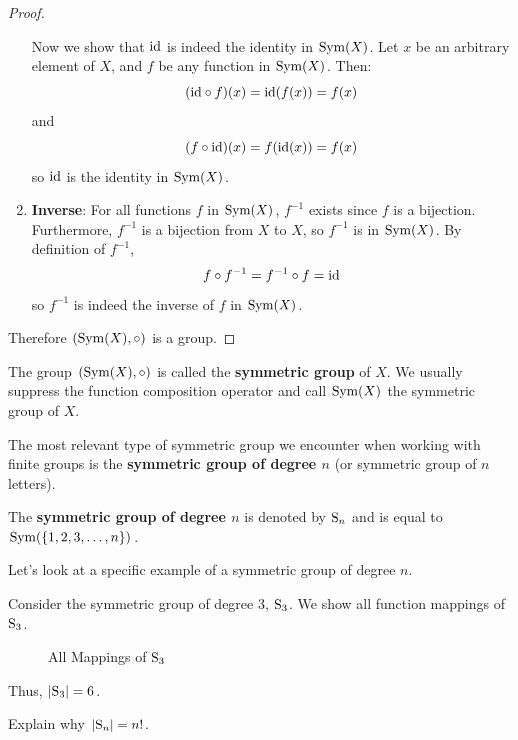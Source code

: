\begin{proof}
\begin{enumerate}
\begin{itemize}
        \end{itemize}
        Now we show that $\mathrm{id}$ is indeed the identity in $\mathrm{Sym}(X)$. Let $x$ be an arbitrary element of $X$, and $f$ be any function in $\mathrm{Sym}(X)$. Then:
        \[
            (\mathrm{id} \circ f)(x) = \mathrm{id}(f(x)) = f(x)
        \]
        and
        \[
            (f \circ \mathrm{id})(x) = f(\mathrm{id}(x)) = f(x)
        \]
        so $\mathrm{id}$ is the identity in $\mathrm{Sym}(X)$.
        \item \textbf{Inverse}: For all functions $f$ in $\mathrm{Sym}(X)$, $f^{-1}$ exists since $f$ is a bijection. Furthermore, $f^{-1}$ is a bijection from $X$ to $X$, so $f^{-1}$ is in $\mathrm{Sym}(X)$. By definition of $f^{-1}$,
        \[
            f \circ f^{-1} = f^{-1} \circ f = \mathrm{id}
        \]
        so $f^{-1}$ is indeed the inverse of $f$ in $\mathrm{Sym}(X)$.
    \end{enumerate}
    Therefore $(\mathrm{Sym}(X), \circ)$ is a group.
\end{proof}

The group $(\mathrm{Sym}(X), \circ)$ is called the \textbf{symmetric group} of $X$. We usually suppress the function composition operator and call $\mathrm{Sym}(X)$ the symmetric group of $X$.

The most relevant type of symmetric group we encounter when working with finite groups is the \textbf{symmetric group of degree $n$} (or symmetric group of $n$ letters).
\begin{definition}
    The \textbf{symmetric group of degree $n$} is denoted by $\mathrm{S}_{n}$ and is equal to $\mathrm{Sym}(\{1, 2, 3, \dots, n\})$.
\end{definition}

Let's look at a specific example of a symmetric group of degree $n$.
\begin{example}\label{example-symmetric-group-of-degree-3}
    Consider the symmetric group of degree 3, $\mathrm{S}_{3}$. We show all function mappings of $\mathrm{S}_{3}$.

    \begin{figure}[h]
        \centering
        \caption{All Mappings of $\mathrm{S}_{3}$}
    \end{figure}

    Thus, $|\mathrm{S}_{3}| = 6$.
\end{example}
\begin{exercise}\label{exercise-order-of-Sn}
    Explain why $|\mathrm{S}_{n}| = n!$.
\end{exercise}

